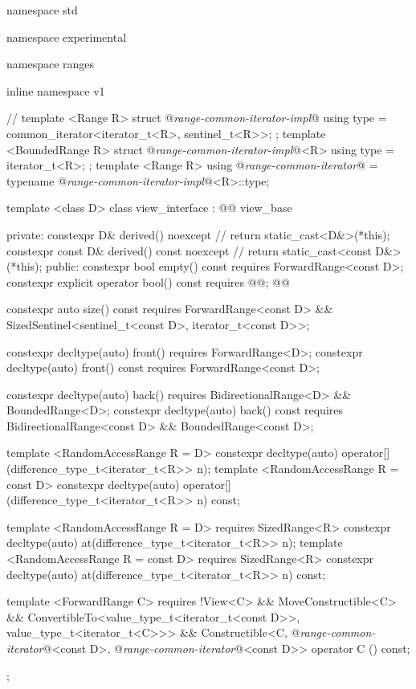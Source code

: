 %
\begin{codeblock}
namespace std { namespace experimental { namespace ranges { inline namespace v1
{
  // \expos
  template <Range R>
  struct @\textit{range-common-iterator-impl}@ {
    using type = common_iterator<iterator_t<R>, sentinel_t<R>>;
  };
  template <BoundedRange R>
  struct @\textit{range-common-iterator-impl}@<R> {
    using type = iterator_t<R>;
  };
  template <Range R>
    using @\textit{range-common-iterator}@ =
      typename @\textit{range-common-iterator-impl}@<R>::type;

  template <class D>
  class view_interface : @@ view_base {
  private:
    constexpr D& derived() noexcept { // \expos
      return static_cast<D&>(*this);
    }
    constexpr const D& derived() const noexcept { // \expos
      return static_cast<const D&>(*this);
    }
  public:
    constexpr bool empty() const requires ForwardRange<const D>;
    constexpr explicit operator bool() const
      requires @@;
    @@

    constexpr auto size() const requires ForwardRange<const D> &&
      SizedSentinel<sentinel_t<const D>, iterator_t<const D>>;

    constexpr decltype(auto) front() requires ForwardRange<D>;
    constexpr decltype(auto) front() const requires ForwardRange<const D>;

    constexpr decltype(auto) back()
      requires BidirectionalRange<D> && BoundedRange<D>;
    constexpr decltype(auto) back() const
      requires BidirectionalRange<const D> && BoundedRange<const D>;

    template <RandomAccessRange R = D>
      constexpr decltype(auto) operator[](difference_type_t<iterator_t<R>> n);
    template <RandomAccessRange R = const D>
      constexpr decltype(auto) operator[](difference_type_t<iterator_t<R>> n) const;

    template <RandomAccessRange R = D>
        requires SizedRange<R>
      constexpr decltype(auto) at(difference_type_t<iterator_t<R>> n);
    template <RandomAccessRange R = const D>
        requires SizedRange<R>
      constexpr decltype(auto) at(difference_type_t<iterator_t<R>> n) const;

    template <ForwardRange C>
        requires !View<C> && MoveConstructible<C> &&
          ConvertibleTo<value_type_t<iterator_t<const D>>, value_type_t<iterator_t<C>>> &&
          Constructible<C, @\textit{range-common-iterator}@<const D>, @\textit{range-common-iterator}@<const D>>
      operator C () const;
  };
}}}}
\end{codeblock}

